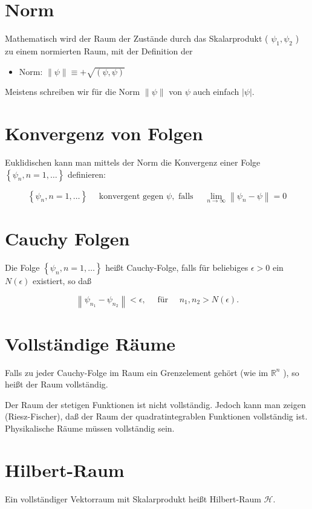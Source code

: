 \documentclass[10pt, letterpaper]{article}
\begin{document}
\section*{Norm}
Mathematisch wird der Raum der Zustände durch das Skalarprodukt ( $\psi_{1}, \psi_{2}$ ) zu einem normierten Raum, mit der Definition der

\begin{itemize}
  \item Norm: $\|\psi\| \equiv+\sqrt{(\psi, \psi)}$
\end{itemize}

Meistens schreiben wir für die Norm $\|\psi\|$ von $\psi$ auch einfach $|\psi|$.

\section*{Konvergenz von Folgen}
Euklidischen kann man mittels der Norm die Konvergenz einer Folge $\left\{\psi_{n}, n=1, \ldots\right\}$ definieren:

$$
\left\{\psi_{n}, n=1, \ldots\right\} \quad \text { konvergent gegen } \psi, \text { falls } \quad \lim _{n \rightarrow \infty}\left\|\psi_{n}-\psi\right\|=0
$$

\section*{Cauchy Folgen}
Die Folge $\left\{\psi_{n}, n=1, \ldots\right\}$ heißt Cauchy-Folge, falls für beliebiges $\epsilon>0$ ein $N(\epsilon)$ existiert, so daß

$$
\left\|\psi_{n_{1}}-\psi_{n_{2}}\right\|<\epsilon, \quad \text { für } \quad n_{1}, n_{2}>N(\epsilon) .
$$

\section*{Vollständige Räume}
Falls zu jeder Cauchy-Folge im Raum ein Grenzelement gehört (wie im $\mathbb{R}^{n}$ ), so heißt der Raum vollständig.

Der Raum der stetigen Funktionen ist nicht vollständig. Jedoch kann man zeigen (Riesz-Fischer), daß der Raum der quadratintegrablen Funktionen vollständig ist. Physikalische Räume müssen vollständig sein.

\section*{Hilbert-Raum}
Ein vollständiger Vektorraum mit Skalarprodukt heißt Hilbert-Raum $\mathcal{H}$.
\end{document}
